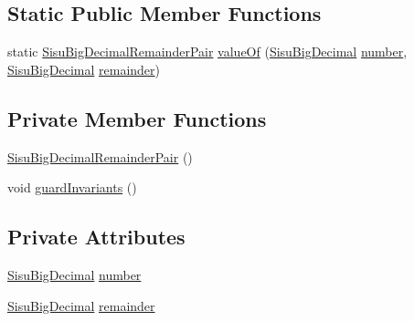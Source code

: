 \subsection*{Static Public Member Functions}
\begin{DoxyCompactItemize}
\item 
static \hyperlink{classcom_1_1aarrelaakso_1_1drawl_1_1_sisu_big_decimal_remainder_pair}{Sisu\+Big\+Decimal\+Remainder\+Pair} \hyperlink{classcom_1_1aarrelaakso_1_1drawl_1_1_sisu_big_decimal_remainder_pair_ad23fce014bb13131e936ebbbbc33c9b2}{value\+Of} (\hyperlink{classcom_1_1aarrelaakso_1_1drawl_1_1_sisu_big_decimal}{Sisu\+Big\+Decimal} \hyperlink{classcom_1_1aarrelaakso_1_1drawl_1_1_sisu_big_decimal_remainder_pair_aa9a5427a9e385635c8926422a430dcdd}{number}, \hyperlink{classcom_1_1aarrelaakso_1_1drawl_1_1_sisu_big_decimal}{Sisu\+Big\+Decimal} \hyperlink{classcom_1_1aarrelaakso_1_1drawl_1_1_sisu_big_decimal_remainder_pair_aa67b06e15115b1930dae9de0aa8e039f}{remainder})
\end{DoxyCompactItemize}
\subsection*{Private Member Functions}
\begin{DoxyCompactItemize}
\item 
\hyperlink{classcom_1_1aarrelaakso_1_1drawl_1_1_sisu_big_decimal_remainder_pair_a139cc916cab6cd674513508b8f70a11b}{Sisu\+Big\+Decimal\+Remainder\+Pair} ()
\item 
void \hyperlink{classcom_1_1aarrelaakso_1_1drawl_1_1_sisu_big_decimal_remainder_pair_a0319a83bc7d31bf3950f4a99c44ae781}{guard\+Invariants} ()
\end{DoxyCompactItemize}
\subsection*{Private Attributes}
\begin{DoxyCompactItemize}
\item 
\hyperlink{classcom_1_1aarrelaakso_1_1drawl_1_1_sisu_big_decimal}{Sisu\+Big\+Decimal} \hyperlink{classcom_1_1aarrelaakso_1_1drawl_1_1_sisu_big_decimal_remainder_pair_aa9a5427a9e385635c8926422a430dcdd}{number}
\item 
\hyperlink{classcom_1_1aarrelaakso_1_1drawl_1_1_sisu_big_decimal}{Sisu\+Big\+Decimal} \hyperlink{classcom_1_1aarrelaakso_1_1drawl_1_1_sisu_big_decimal_remainder_pair_aa67b06e15115b1930dae9de0aa8e039f}{remainder}
\end{DoxyCompactItemize}


